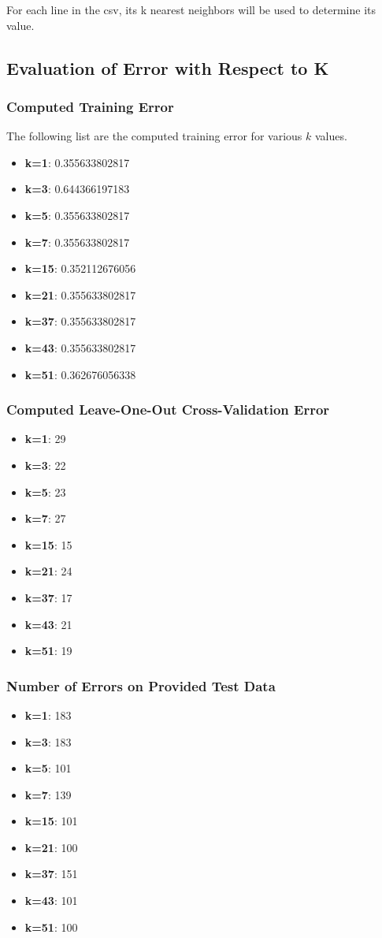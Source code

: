 \documentclass[letterpaper,10pt]{article}
\begin{document}
For each line in the csv, its k nearest neighbors will be used to determine its value.\\

\subsection{Evaluation of Error with Respect to K}
\subsubsection{Computed Training Error}
The following list are the computed training error for various \(k\) values.
\begin{itemize}
	\item{\textbf{k=1}: 0.355633802817}
	\item{\textbf{k=3}: 0.644366197183}
	\item{\textbf{k=5}: 0.355633802817 }
	\item{\textbf{k=7}: 0.355633802817}
	\item{\textbf{k=15}: 0.352112676056}
	\item{\textbf{k=21}: 0.355633802817}
	\item{\textbf{k=37}: 0.355633802817}
	\item{\textbf{k=43}: 0.355633802817}
	\item{\textbf{k=51}: 0.362676056338}
\end{itemize}
\subsubsection{Computed Leave-One-Out Cross-Validation Error}
\begin{itemize}
	\item{\textbf{k=1}: 29}
	\item{\textbf{k=3}: 22}
	\item{\textbf{k=5}: 23}
	\item{\textbf{k=7}: 27}
	\item{\textbf{k=15}: 15}
	\item{\textbf{k=21}: 24}
	\item{\textbf{k=37}: 17}
	\item{\textbf{k=43}: 21}
	\item{\textbf{k=51}: 19}
\end{itemize}
\subsubsection{Number of Errors on Provided Test Data}
\begin{itemize}
	\item{\textbf{k=1}: 183}
	\item{\textbf{k=3}: 183}
	\item{\textbf{k=5}: 101}
	\item{\textbf{k=7}: 139}
	\item{\textbf{k=15}: 101}
	\item{\textbf{k=21}: 100}
	\item{\textbf{k=37}: 151}
	\item{\textbf{k=43}: 101}
	\item{\textbf{k=51}: 100}
\end{itemize}
\end{document}
